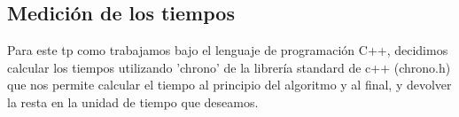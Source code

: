 \subsection{Medición de los tiempos}

Para este tp como trabajamos bajo el lenguaje de programación C++, decidimos calcular los tiempos utilizando 'chrono' de la librería standard de c++ (chrono.h) que nos permite calcular el tiempo al principio del algoritmo y al final, y devolver la resta en la unidad de tiempo que deseamos.\\ \\


% 

% 

% 

